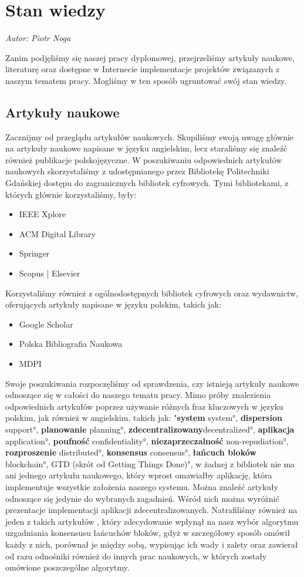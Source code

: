 \chapter{Stan wiedzy}
\label{chap:stan_wiedzy}
\textit{Autor: Piotr Noga}
\par Zanim podjęliśmy się naszej pracy dyplomowej, przejrzeliśmy artykuły naukowe, literaturę oraz dostępne w Internecie implementacje projektów związanych z naszym tematem pracy. Mogliśmy w ten sposób ugruntować swój stan wiedzy.
\section{Artykuły naukowe}
\label{sec:ArtykulyNaukowe}
Zacznijmy od przeglądu artykułów naukowych. Skupiliśmy swoją uwagę głównie na artykuły naukowe napisane w języku angielskim, lecz staraliśmy się znaleźć również publikacje polskojęzyczne. W poszukiwaniu odpowiednich artykułów naukowych skorzystaliśmy z udostępnianego przez Bibliotekę Politechniki Gdańskiej dostępu do zagranicznych bibliotek cyfrowych. Tymi bibliotekami, z których głównie korzystaliśmy, były:
\begin{itemize}
    \item IEEE Xplore
    \item ACM Digital Library
    \item Springer
    \item Scopus | Elsevier
\end{itemize}
Korzystaliśmy również z ogólnodostępnych bibliotek cyfrowych oraz wydawnictw, oferujących artykuły napisane w języku polskim, takich jak:
\begin{itemize}
    \item Google Scholar
    \item Polska Bibliografia Naukowa
    \item MDPI
\end{itemize}
Swoje poszukiwania rozpoczęliśmy od sprawdzenia, czy istnieją artykuły naukowe odnoszące się w całości do naszego tematu pracy. Mimo próby znalezienia odpowiednich artykułów  poprzez używanie różnych fraz kluczowych w języku polskim, jak również w angielskim, takich jak: "\textbf{system} \ang{system}, \textbf{dispersion} \ang{support}, \textbf{planowanie} \ang{planning}, \textbf{zdecentralizowany}\ang{decentralized}, \textbf{aplikacja} \ang{application}, \textbf{poufność} \ang{confidentiality}, \textbf{niezaprzeczalność} \ang{non-repudiation}, \textbf{rozproszenie} \ang{distributed}, \textbf{konsensus} \ang{consensus}, \textbf{łańcuch bloków} \ang{blockchain}, GTD (skrót od Getting Things Done)", w żadnej z bibliotek nie ma ani jednego artykułu naukowego, który wprost omawiałby aplikację, która implementuje wszystkie założenia naszego systemu. Można znaleźć artykuły odnoszące się jedynie do wybranych zagadnień. Wśród nich można wyróżnić prezentacje implementacji aplikacji zdecentralizowanych. Natrafiliśmy również na jeden z takich artykułów \cite{EvolutionOfBlockchainCon}, który zdecydowanie wpłynął na nasz wybór algorytmu uzgadniania konsensusu łańcuchów bloków, gdyż w szczegółowy sposób omówił każdy z nich, porównał je między sobą, wypisując ich wady i zalety oraz zawierał od razu odnośniki również do innych prac naukowych, w których zostały omówione poszczególne algorytmy.%

